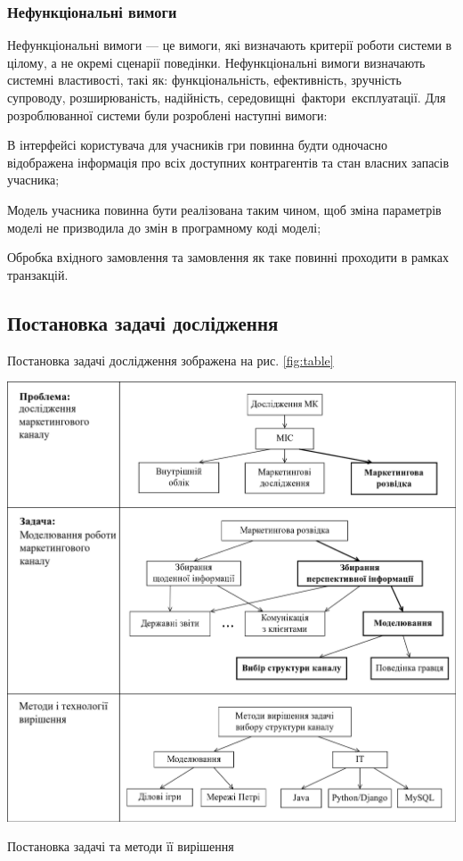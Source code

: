         \subsubsection{Нефункціональні вимоги}
Нефункціональні вимоги --- це вимоги, які визначають критерії роботи системи в цілому, а не окремі сценарії поведінки. Нефункціональні вимоги визначають системні властивості, такі як: функціональність, ефективність, зручність супроводу, розширюваність, надійність, середовищні фактори експлуатації. Для розроблюванної системи були розроблені наступні вимоги:
            \begin{longEnumerate}
\item В інтерфейсі користувача для учасників гри повинна будти одночасно відображена інформація про всіх доступних контрагентів та стан власних запасів учасника;
\item Модель учасника повинна бути реалізована таким чином, щоб зміна параметрів моделі не призводила до змін в програмному коді моделі; %
\item Обробка вхідного замовлення та замовлення як таке повинні проходити в рамках транзакцій.
            \end{longEnumerate}  
\subsection{Постановка задачі дослідження}
Постановка задачі дослідження зображена на рис. \ref{fig:table}
            \begin{stdfigure}
                \includegraphics[width=7in]{images/table.png}
                \caption{Постановка задачі та методи її вирішення}
                \label{fig:table}
            \end{stdfigure}

